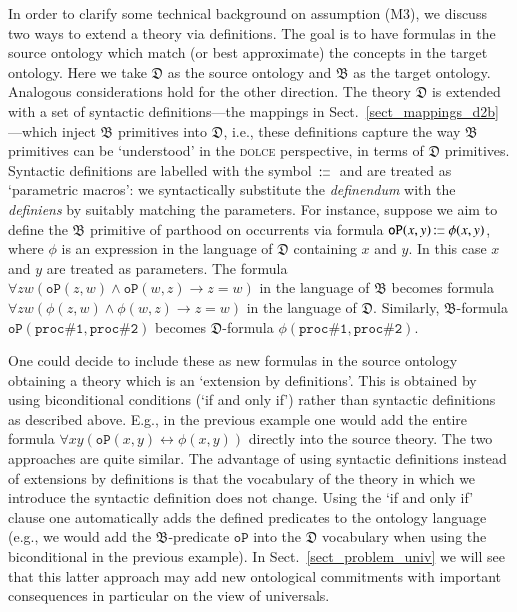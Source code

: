 \documentclass[ao]{iosart2x}
\newcommand{\pr}[1]{\mathtt{#1}}
\newcommand{\cn}[1]{\mathtt{#1}}
\newcommand{\ifif}{\leftrightarrow}
\newcommand\textequal{%
 \rule[.08ex]{5pt}{0.35pt}\llap{\rule[.78ex]{5pt}{0.35pt}}}
\newcommand{\sdef}{{\hspace{1.5pt}:\hspace{-2.5pt}\textequal\hspace{3pt}}}
\newcommand{\dolce}{{\textsc{dolce}}}
\newcommand {\thdolce} {\ensuremath{\mathfrak{D}}}
\newcommand {\thbfo} {\ensuremath{\mathfrak{B}}}
\newcommand{\bfoopart}{\pr{oP}}
\begin{document}
In order to clarify some technical background on assumption (M3), we discuss two ways to extend a theory via definitions. The goal is to have formulas in the source ontology which match (or best approximate) the concepts in the target ontology. Here we take {$\thdolce$} as the source ontology and {$\thbfo$} as the target ontology. Analogous considerations hold for the other direction. The theory $\thdolce$ is extended with a set of syntactic definitions---the mappings in Sect.~\ref{sect_mappings_d2b}---which inject {$\thbfo$} primitives into {$\thdolce$}, i.e., these definitions capture the way {$\thbfo$} primitives can be `understood' in the {\dolce} perspective, in terms of {$\thdolce$} primitives. 
Syntactic definitions are labelled with the symbol {$\sdef$} and are treated as `parametric macros': we syntactically substitute the \emph{definendum} with the \emph{definiens} by suitably matching the parameters. For instance, suppose we aim to define the {$\thbfo$} primitive of  parthood on occurrents via formula $\bfoopart(x,y) \sdef \phi(x,y)$, where $\phi$ is an expression in the language of {$\thdolce$} containing $x$ and $y$. In this case $x$ and $y$ are treated as parameters. The formula $\forall zw(\bfoopart(z,w) \land \bfoopart(w,z) \to z=w)$ in the language of {$\thbfo$} becomes formula $\forall zw(\phi(z,w) \land \phi(w,z) \to z=w)$ in the language of {$\thdolce$}. Similarly, {$\thbfo$}-formula $\bfoopart(\cn{proc\#1},\cn{proc\#2})$ becomes {$\thdolce$}-formula $\phi(\cn{proc\#1},\cn{proc\#2})$. 

One could decide to include these as new formulas in the source ontology obtaining a theory which is an `extension by definitions'. This is obtained by using biconditional conditions (`if and only if') rather than syntactic definitions as described above. E.g., in the previous example one would add the entire formula $\forall xy(\bfoopart(x,y) \ifif \phi(x,y))$ directly into the source theory. The two approaches are quite similar. The advantage of using syntactic definitions instead of extensions by definitions is that the vocabulary of the theory in which we introduce the syntactic definition does not change. Using the `if and only if' clause one automatically adds the defined predicates to the ontology language (e.g., we would add the {$\thbfo$}-predicate $\bfoopart$ into the {$\thdolce$} vocabulary when using the biconditional in the previous example). In Sect.~\ref{sect_problem_univ} we will see that this latter approach may add new ontological commitments with important consequences in particular on the view of universals.
\end{document}
